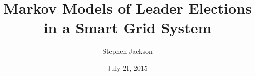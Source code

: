 \documentclass[12pt,oneside]{article}
\begin{document}
\title{Markov Models of Leader Elections in a Smart Grid System}
\author{Stephen Jackson}
\date{July 21, 2015}
\maketitle

%
%
%
%
%
%
%
%
%


%
%
\end{document}
